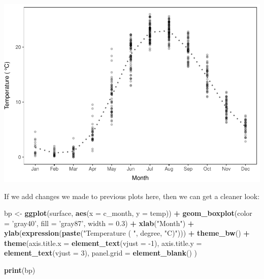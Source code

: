 \documentclass[
]{book}
\newenvironment{Shaded}{\begin{snugshade}}{\end{snugshade}}
\newcommand{\DataTypeTok}[1]{\textcolor[rgb]{0.13,0.29,0.53}{#1}}
\newcommand{\DecValTok}[1]{\textcolor[rgb]{0.00,0.00,0.81}{#1}}
\newcommand{\FloatTok}[1]{\textcolor[rgb]{0.00,0.00,0.81}{#1}}
\newcommand{\KeywordTok}[1]{\textcolor[rgb]{0.13,0.29,0.53}{\textbf{#1}}}
\newcommand{\NormalTok}[1]{#1}
\newcommand{\OperatorTok}[1]{\textcolor[rgb]{0.81,0.36,0.00}{\textbf{#1}}}
\newcommand{\StringTok}[1]{\textcolor[rgb]{0.31,0.60,0.02}{#1}}
\begin{document}
\includegraphics{worstr_files/figure-latex/unnamed-chunk-111-1.pdf}

If we add changes we made to previous plots here, then we can get a cleaner look:

\begin{Shaded}
\begin{Highlighting}[]
\NormalTok{bp <-}\StringTok{ }\KeywordTok{ggplot}\NormalTok{(surface, }\KeywordTok{aes}\NormalTok{(}\DataTypeTok{x =}\NormalTok{ c_month, }\DataTypeTok{y =}\NormalTok{ temp)) }\OperatorTok{+}
\StringTok{  }\KeywordTok{geom_boxplot}\NormalTok{(}\DataTypeTok{color =} \StringTok{'gray40'}\NormalTok{, }\DataTypeTok{fill =} \StringTok{'gray87'}\NormalTok{, }\DataTypeTok{width =} \FloatTok{0.3}\NormalTok{) }\OperatorTok{+}
\StringTok{  }\KeywordTok{xlab}\NormalTok{(}\StringTok{"Month"}\NormalTok{) }\OperatorTok{+}
\StringTok{  }\KeywordTok{ylab}\NormalTok{(}\KeywordTok{expression}\NormalTok{(}\KeywordTok{paste}\NormalTok{(}\StringTok{"Temperature ( "}\NormalTok{, degree, }\StringTok{"C)"}\NormalTok{))) }\OperatorTok{+}
\StringTok{  }\KeywordTok{theme_bw}\NormalTok{() }\OperatorTok{+}
\StringTok{  }\KeywordTok{theme}\NormalTok{(}\DataTypeTok{axis.title.x =} \KeywordTok{element_text}\NormalTok{(}\DataTypeTok{vjust =} \DecValTok{-1}\NormalTok{),}
        \DataTypeTok{axis.title.y =} \KeywordTok{element_text}\NormalTok{(}\DataTypeTok{vjust =} \DecValTok{3}\NormalTok{),}
        \DataTypeTok{panel.grid =} \KeywordTok{element_blank}\NormalTok{()}
\NormalTok{  )}

\KeywordTok{print}\NormalTok{(bp)}
\end{Highlighting}
\end{Shaded}
\end{document}
